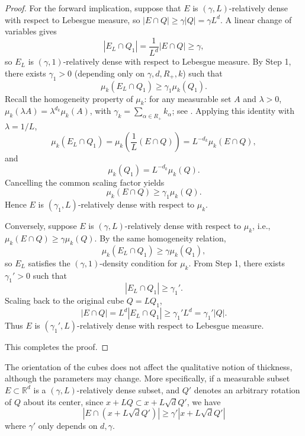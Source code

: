 \documentclass[12pt]{article}
\begin{document}
\begin{proof}
For the forward implication, suppose that $E$ is $(\gamma,L)$-relatively dense with respect to Lebesgue measure, so $|E\cap Q| \ge \gamma |Q| = \gamma L^d$. A linear change of variables gives
\[
|E_L \cap Q_1| = \frac{1}{L^d} |E \cap Q| \ge \gamma,
\]
so $E_L$ is $(\gamma,1)$-relatively dense with respect to Lebesgue measure. By Step 1, there exists $\gamma_1>0$ (depending only on $\gamma,d,R_+,k$) such that
\[
\mu_k(E_L \cap Q_1) \ge \gamma_1 \mu_k(Q_1).
\]
Recall the homogeneity property of $\mu_k$: for any measurable set $A$ and $\lambda>0$, $\mu_k(\lambda A) = \lambda^{d_k} \mu_k(A)$, with $\gamma_k = \sum_{\alpha\in R_+} k_\alpha$; see \cite{MR1}. Applying this identity with $\lambda=1/L$,
\[
\mu_k(E_L \cap Q_1) = \mu_k\left( \frac{1}{L} (E\cap Q) \right)
= L^{-d_k} \mu_k(E\cap Q),
\]
and
\[
\mu_k(Q_1) = L^{-d_k} \mu_k(Q).
\]
Cancelling the common scaling factor yields
\[
\mu_k(E\cap Q) \ge \gamma_1 \mu_k(Q).
\]
Hence $E$ is $(\gamma_1, L)$-relatively dense with respect to $\mu_k$.

Conversely, suppose $E$ is $(\gamma,L)$-relatively dense with respect to $\mu_k$, i.e., $\mu_k(E\cap Q) \ge \gamma \mu_k(Q)$. By the same homogeneity relation,
\[
\mu_k(E_L \cap Q_1) \ge \gamma \mu_k(Q_1),
\]
so $E_L$ satisfies the $(\gamma,1)$-density condition for $\mu_k$. From Step 1, there exists $\gamma_1'>0$ such that
\[
|E_L \cap Q_1| \ge \gamma_1'.
\]
Scaling back to the original cube $Q=L Q_1$,
\[
|E\cap Q| = L^d |E_L \cap Q_1| \ge \gamma_1' L^d = \gamma_1' |Q|.
\]
Thus $E$ is $(\gamma_1', L)$-relatively dense with respect to Lebesgue measure.

This completes the proof.
\end{proof}
\begin{remark} \label{RR3}
The orientation of the cubes does not affect the qualitative notion of thickness, although the parameters may change. More specifically, if a measurable subset $E\subset \mathbb{R}^d$ is a $(\gamma, L)$-relatively dense subset, and $Q'$ denotes an arbitrary rotation of $Q$ about its center, since $x+LQ\subset x+L\sqrt{d}Q'$, we have
\[
|E\cap (x+L\sqrt{d} Q')|\geq \gamma' |x+L\sqrt{d}Q'|
\]
 where $\gamma'$ only depends on $d,\gamma$.

\end{remark}
\end{document}
